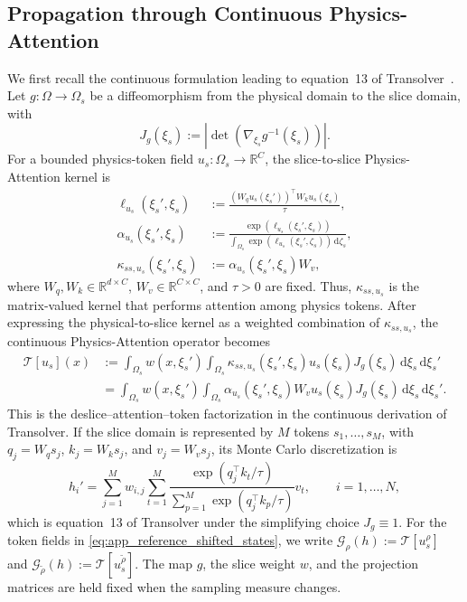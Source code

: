 \subsection{Propagation through Continuous Physics-Attention}
\label{app:attention_bias}

We first recall the continuous formulation leading to equation~13 of Transolver~\citep{wu2024transolver}. Let $g:\Omega\to\Omega_s$ be a diffeomorphism from the physical domain to the slice domain, with
\begin{equation}
    J_g(\xi_s)
    :=\left|\det\!\left(\nabla_{\xi_s}g^{-1}(\xi_s)\right)\right|.
    \label{eq:app_slice_jacobian}
\end{equation}
For a bounded physics-token field $u_s:\Omega_s\to\mathbb{R}^{C}$, the slice-to-slice Physics-Attention kernel is
\begin{align}
    \ell_{u_s}(\xi_s',\xi_s)
    &:=\frac{(W_qu_s(\xi_s'))^{\top}W_ku_s(\xi_s)}{\tau},
    \nonumber\\
    \alpha_{u_s}(\xi_s',\xi_s)
    &:=\frac{\exp(\ell_{u_s}(\xi_s',\xi_s))}
    {\int_{\Omega_s}\exp(\ell_{u_s}(\xi_s',\zeta_s))\,\mathrm{d}\zeta_s},
    \nonumber\\
    \kappa_{ss,u_s}(\xi_s',\xi_s)
    &:=\alpha_{u_s}(\xi_s',\xi_s)W_v,
    \label{eq:app_continuous_attention_kernel}
\end{align}
where $W_q,W_k\in\mathbb{R}^{d\times C}$, $W_v\in\mathbb{R}^{C\times C}$, and $\tau>0$ are fixed. Thus, $\kappa_{ss,u_s}$ is the matrix-valued kernel that performs attention among physics tokens. After expressing the physical-to-slice kernel as a weighted combination of $\kappa_{ss,u_s}$, the continuous Physics-Attention operator becomes
\begin{align}
    \mathcal{T}[u_s](x)
    &:=\int_{\Omega_s}w(x,\xi_s')
    \int_{\Omega_s}\kappa_{ss,u_s}(\xi_s',\xi_s)
    u_s(\xi_s)J_g(\xi_s)
    \,\mathrm{d}\xi_s\,\mathrm{d}\xi_s'
    \nonumber\\
    &=\int_{\Omega_s}w(x,\xi_s')
    \int_{\Omega_s}\alpha_{u_s}(\xi_s',\xi_s)
    W_vu_s(\xi_s)J_g(\xi_s)
    \,\mathrm{d}\xi_s\,\mathrm{d}\xi_s'.
    \label{eq:app_continuous_physics_attention}
\end{align}
This is the deslice--attention--token factorization in the continuous derivation of Transolver. If the slice domain is represented by $M$ tokens $s_1,\ldots,s_M$, with $q_j=W_qs_j$, $k_j=W_ks_j$, and $v_j=W_vs_j$, its Monte Carlo discretization is
\begin{equation}
    h_i'
    =\sum_{j=1}^{M}w_{i,j}
    \sum_{t=1}^{M}
    \frac{\exp(q_j^{\top}k_t/\tau)}
    {\sum_{p=1}^{M}\exp(q_j^{\top}k_p/\tau)}v_t,
    \qquad i=1,\ldots,N,
    \label{eq:app_transolver_discrete_attention}
\end{equation}
which is equation~13 of Transolver under the simplifying choice $J_g\equiv1$. For the token fields in \eqref{eq:app_reference_shifted_states}, we write $\mathcal{G}_{\rho}(h):=\mathcal{T}[u_s^{\rho}]$ and $\mathcal{G}_{\widetilde{\rho}}(h):=\mathcal{T}[u_s^{\widetilde{\rho}}]$. The map $g$, the slice weight $w$, and the projection matrices are held fixed when the sampling measure changes.

